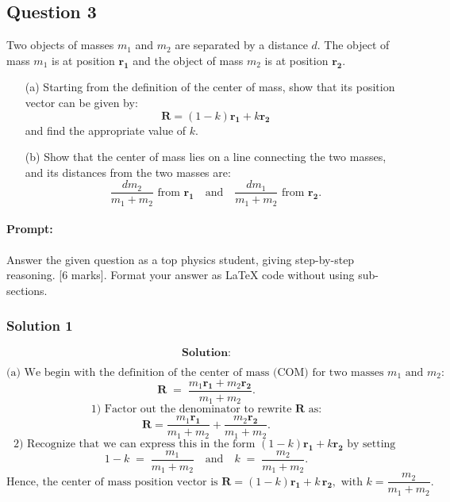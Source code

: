 \documentclass{article}
\begin{document}
\subsection{Question 3}

Two objects of masses $m_1$ and $m_2$ are separated by a distance $d$. The object of mass $m_1$ is at position $\mathbf{r_1}$ and the object of mass $m_2$ is at position $\mathbf{r_2}$.

\begin{itemize}
    \item[(a)] Starting from the definition of the center of mass, show that its position vector can be given by:
    \[
    \mathbf{R} = (1 - k)\mathbf{r_1} + k\mathbf{r_2}
    \]
    and find the appropriate value of $k$.
    
    \item[(b)] Show that the center of mass lies on a line connecting the two masses, and its distances from the two masses are:
    \[
    \frac{dm_2}{m_1 + m_2} \text{ from } \mathbf{r_1} \quad \text{and} \quad \frac{dm_1}{m_1 + m_2} \text{ from } \mathbf{r_2}.
    \]
\end{itemize}

\paragraph{Prompt: \\} 
Answer the given question as a top physics student, giving step-by-step reasoning. [6 marks].
Format your answer as LaTeX code without using sub-sections. 

\subsubsection{Solution 1}
\[
\textbf{Solution:}
\]

\[
\text{(a) We begin with the definition of the center of mass (COM) for two masses } m_1 \text{ and } m_2:
\]
\[
\mathbf{R} \;=\; \frac{m_1 \mathbf{r_1} + m_2 \mathbf{r_2}}{m_1 + m_2}.
\]
\[
\text{1) Factor out the denominator to rewrite }\mathbf{R}\text{ as:}
\]
\[
\mathbf{R} 
= \frac{m_1 \mathbf{r_1}}{m_1 + m_2} + \frac{m_2 \mathbf{r_2}}{m_1 + m_2}.
\]
\[
\text{2) Recognize that we can express this in the form }(1 - k)\mathbf{r_1} + k \mathbf{r_2}\text{ by setting }
\]
\[
1-k \;=\; \frac{m_1}{m_1 + m_2}
\quad\text{and}\quad
k \;=\; \frac{m_2}{m_1 + m_2}.
\]
\[
\text{Hence, the center of mass position vector is }
\mathbf{R} = (1 - k)\mathbf{r_1} + k\,\mathbf{r_2},
\text{ with }
k = \frac{m_2}{m_1 + m_2}.
\]
\end{document}
